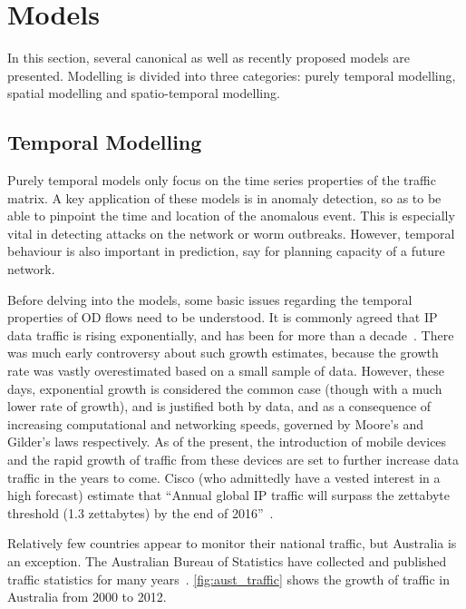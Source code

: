 \clearpage
\section{Models}
\label{sec:models}

In this section, several canonical as well as recently proposed models
are presented. Modelling is divided into three categories: purely
temporal modelling, spatial modelling and spatio-temporal modelling.
 
\subsection{Temporal Modelling}
\label{ssec:temporal_modelling}

Purely temporal models only focus on the time series properties of the
traffic matrix. A key application of these models is in anomaly
detection, so as to be able to pinpoint the time and location of the
anomalous event. This is especially vital in detecting attacks on the
network or worm outbreaks. However, temporal behaviour is also
important in prediction, say for planning capacity of a future
network.

Before delving into the models, some basic issues regarding the
temporal properties of OD flows need to be understood. It is commonly
agreed that IP data traffic is rising exponentially, and has been for
more than a 
decade~\cite{claffy94:_track_long_term_growt_of_nsfnet,groschwitz94:_time_series_model_of_long,odlyzko03:_internet_growth,cisco_visual_networ_index2011}. There
was much early controversy about such growth estimates, because the
growth rate was vastly overestimated based on a small sample of
data. However, these days, exponential growth is considered the common
case (though with a much lower rate of growth), and is justified both
by data, and as a consequence of increasing computational and
networking speeds, governed by Moore's and Gilder's laws
respectively. As of the present, the introduction of mobile devices
and the rapid growth of traffic from these devices are set to further
increase data traffic in the years to come. Cisco (who admittedly have
a vested interest in a high forecast) estimate that ``Annual global IP
traffic will surpass the zettabyte threshold (1.3 zettabytes) by the
end of 2016''~\cite{cisco_visual_networ_index2011}.

Relatively few countries appear to monitor their national traffic, but
Australia is an exception. The Australian Bureau of Statistics have
collected and published traffic statistics for many
years~\cite{13:_abs_internet}. \autoref{fig:aust_traffic} shows the
growth of traffic in Australia from 2000 to 2012.
 
